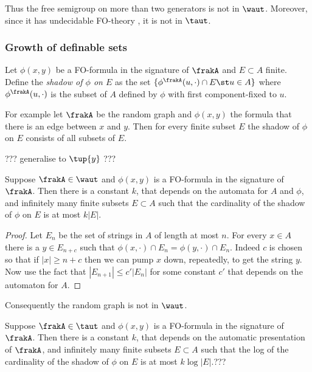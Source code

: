 Thus the free semigroup on more than two generators is not in $\waut$. Moreover, since it has undecidable FO-theory \cite{}, %
it is not in $\taut$.

\subsubsection{Growth of definable sets}

\begin{definition}
Let $\phi(x,y)$ be a FO-formula in the signature of $\frakA$ and $E \subset{A}$ finite. 
Define the {\em shadow of $\phi$ on $E$} as the set $\{\phi^\frakA(u,\cdot) \cap E \st u \in {A}\}$ where $\phi^\frakA(u,\cdot)$
is the subset of $A$ defined by $\phi$ with first component-fixed to $u$.
\end{definition}

For example let $\frakA$ be the random graph and $\phi(x,y)$ the formula that there is an edge between $x$ and $y$.
Then for every finite subset $E$ the shadow of $\phi$ on $E$ consists of all subsets of $E$.

??? generalise to $\tup{y}$ ???
\begin{proposition}[\cite{} \cite{}]
Suppose $\frakA \in \waut$ and $\phi(x,y)$ is a FO-formula in the signature of $\frakA$.
Then there is a constant $k$, 
that depends on the automata for ${A}$ and $\phi$, and infinitely many finite subsets $E \subset {A}$ such
that the cardinality of the shadow of $\phi$ on $E$ is at most $k|E|$.
\end{proposition}

\begin{proof}
Let $E_n$ be the set of strings in ${A}$ of length at most $n$. For every $x \in {A}$ there is a 
$y \in E_{n+c}$ such that $\phi(x,\cdot) \cap E_n = \phi(y,\cdot) \cap E_n$. Indeed $c$ is chosen so that
if $|x| \geq n+c$ then we can pump $x$ down, repeatedly, to get the string $y$.  Now use the fact that
$|E_{n+1}| \leq c'|E_n|$ for some constant $c'$ that depends on the automaton for ${A}$.
\end{proof}

Consequently the random graph is not in $\waut$.

\begin{proposition}
Suppose $\frakA \in \taut$ and $\phi(x,y)$ is a FO-formula in the signature of $\frakA$.
Then there is a constant $k$, 
that depends on the automatic presentation of $\frakA$, and infinitely many finite subsets $E \subset {A}$ such
that the log of the cardinality of the shadow of $\phi$ on $E$ is at most $k\log|E|$.??? 
\end{proposition}

